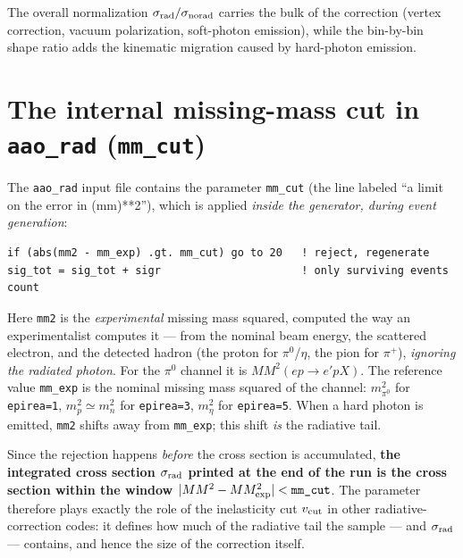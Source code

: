 \documentclass[11pt]{article}
\begin{document}
The overall normalization $\sigma_{\rm rad}/\sigma_{\rm norad}$ carries the
bulk of the correction (vertex correction, vacuum polarization, soft-photon
emission), while the bin-by-bin shape ratio adds the kinematic migration
caused by hard-photon emission.

\section{The internal missing-mass cut in \texttt{aao\_rad} (\texttt{mm\_cut})}
\label{sec:mmcut}

The \texttt{aao\_rad} input file contains the parameter \texttt{mm\_cut}
(the line labeled ``a limit on the error in (mm)**2''), which is applied
\emph{inside the generator, during event generation}:
\begin{lstlisting}
if (abs(mm2 - mm_exp) .gt. mm_cut) go to 20   ! reject, regenerate
sig_tot = sig_tot + sigr                      ! only surviving events count
\end{lstlisting}

Here \texttt{mm2} is the \emph{experimental} missing mass squared, computed
the way an experimentalist computes it --- from the nominal beam energy, the
scattered electron, and the detected hadron (the proton for $\pi^0$/$\eta$,
the pion for $\pi^+$), \emph{ignoring the radiated photon}. For the $\pi^0$
channel it is $MM^2(ep\to e'pX)$. The reference value \texttt{mm\_exp} is
the nominal missing mass squared of the channel: $m^2_{\pi^0}$ for
\texttt{epirea=1}, $m^2_p\simeq m^2_n$ for \texttt{epirea=3}, $m^2_\eta$
for \texttt{epirea=5}. When a hard photon is emitted, \texttt{mm2} shifts
away from \texttt{mm\_exp}; this shift \emph{is} the radiative tail.

Since the rejection happens \emph{before} the cross section is accumulated,
\textbf{the integrated cross section $\sigma_{\rm rad}$ printed at the end
of the run is the cross section within the window
$|MM^2 - MM^2_{\rm exp}| < \texttt{mm\_cut}$}. The parameter therefore
plays exactly the role of the inelasticity cut $v_{\rm cut}$ in other
radiative-correction codes: it defines how much of the radiative tail the
sample --- and $\sigma_{\rm rad}$ --- contains, and hence the size of the
correction itself.
\end{document}
